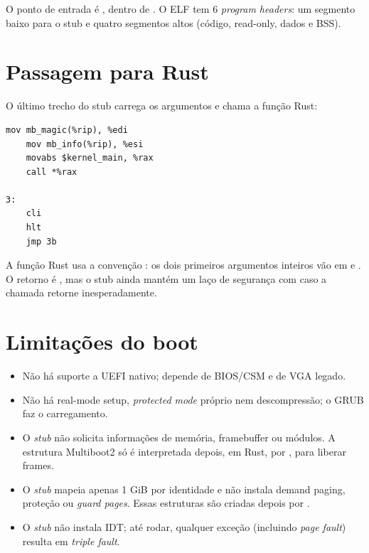 O ponto de entrada \'e , dentro de . O ELF tem
6 \emph{program headers}: um segmento baixo  para o stub e quatro
segmentos altos (c\'odigo, read-only, dados e BSS).

\section{Passagem para Rust}

O \'ultimo trecho do stub carrega os argumentos e chama a fun\c{c}\~ao Rust:

\begin{lstlisting}[caption={Chamada de \code{kernel\_main} a partir do stub.},label={lst:callmain}]
    mov mb_magic(%rip), %edi
    mov mb_info(%rip), %esi
    movabs $kernel_main, %rax
    call *%rax

3:
    cli
    hlt
    jmp 3b
\end{lstlisting}

A fun\c{c}\~ao Rust usa a conven\c{c}\~ao : os dois primeiros
argumentos inteiros v\~ao em  e . O retorno \'e
\code{!}, mas o stub ainda mant\'em um la\c{c}o de seguran\c{c}a com
 caso a chamada retorne inesperadamente.

\section{Limita\c{c}\~oes do boot}

\begin{itemize}
  \item N\~ao h\'a suporte a UEFI nativo; depende de BIOS/CSM e de VGA
        legado.
  \item N\~ao h\'a real-mode setup, \emph{protected mode} pr\'oprio nem
        descompress\~ao; o GRUB faz o carregamento.
  \item O \emph{stub} n\~ao solicita informa\c{c}\~oes de mem\'oria,
        framebuffer ou m\'odulos. A estrutura Multiboot2 s\'o \'e interpretada
        depois, em Rust, por , para liberar frames.
  \item O \emph{stub} mapeia apenas 1 GiB por identidade e n\~ao instala
        demand paging, prote\c{c}\~ao  ou \emph{guard pages}. Essas
        estruturas s\~ao criadas depois por .
  \item O \emph{stub} n\~ao instala IDT; at\'e  rodar,
        qualquer exce\c{c}\~ao (incluindo \emph{page fault}) resulta em
        \emph{triple fault}.
\end{itemize}

